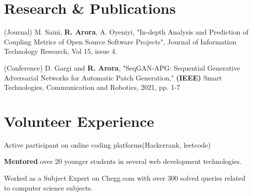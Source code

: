 \documentclass[a4paper,20pt]{article}
\begin{document}
\vspace{-5pt}
\section{Research \& Publications}
\begin{description}[font=$\bullet$, leftmargin=10pt]
\item {(Journal) M. Saini, \textbf{R. Arora}, A. Oyeniyi, "In-depth Analysis and Prediction of Coupling Metrics of Open Source
Software Projects", Journal of Information Technology Research, Vol 15, issue 4.}
\vspace{-5pt}
\item {(Conference) D. Gargi and \textbf{R. Arora}, "SeqGAN-APG: Sequential Generative Adversarial Networks for Automatic
Patch Generation," \textbf{(IEEE)} Smart Technologies, Communication and Robotics, 2021, pp. 1-7 }

\end{description}

\vspace{-7pt}
\section{Volunteer Experience}
 \begin{description}[font=$\bullet$, leftmargin=10pt, ]
\item {Active participant on online coding platforms(Hackerrank, leetcode)}
\vspace{-5pt}
\item {\textbf{Mentored} over 20 younger students in several web development technologies.}
\vspace{-5pt}
\item{
Worked as a Subject Expert on Chegg.com with over 300 solved queries related to computer science subjects.}
\end{description}
\end{document}
